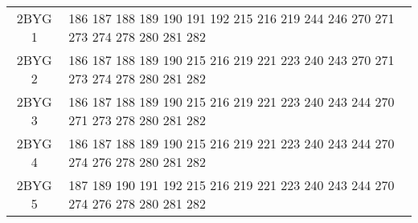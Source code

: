 \begin{table}[!htbp]
{\begin{tabular}{cl}
      2BYG 1 & 186 187 188 189 190 191 192 215 216 219 244 246 270 271 273 274 278 280 281 282 \\
      2BYG 2 & 186 187 188 189 190 215 216 219 221 223 240 243 270 271 273 274 278 280 281 282 \\
      2BYG 3 & 186 187 188 189 190 215 216 219 221 223 240 243 244 270 271 273 278 280 281 282 \\
      2BYG 4 & 186 187 188 189 190 215 216 219 221 223 240 243 244 270 274 276 278 280 281 282 \\
      2BYG 5 & 187 189 190 191 192 215 216 219 221 223 240 243 244 270 274 276 278 280 281 282 \\
      
      \bottomrule
      
    \end{tabular}
  }      
\label{tab:select20}      
\end{table}


